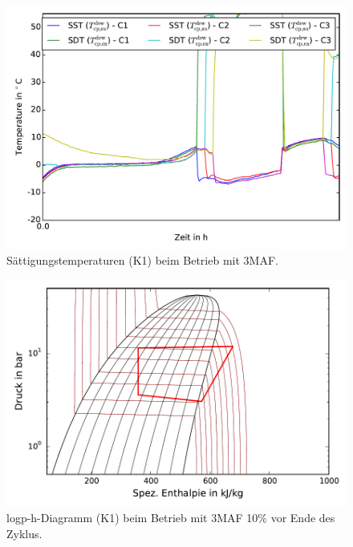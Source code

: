 \begin{figure}[h!]
\centering
\includegraphics[scale=0.8]{Pictures/35/Tsats_lastCycle.pdf}
\caption{Sättigungstemperaturen (K1) beim Betrieb mit 3MAF.}
\label{fig:Tsats35}
\end{figure}

\begin{figure}[h!]
\centering
\includegraphics[scale=0.8]{Pictures/35/log_ph_lastCycle10perc_C1.pdf}
\caption{logp-h-Diagramm (K1) beim Betrieb mit 3MAF \unit{10}{\%} vor Ende des Zyklus.}
\label{fig:logph35}
\end{figure}

